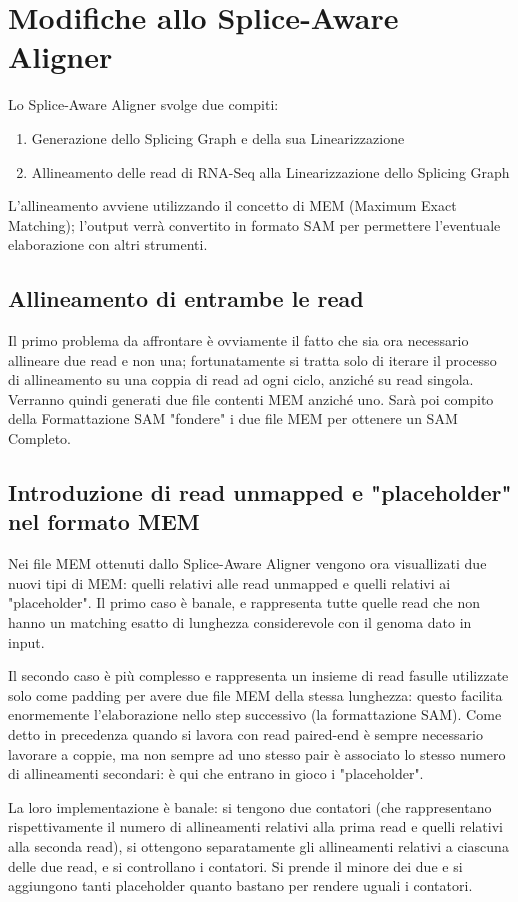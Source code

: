 \section{Modifiche allo Splice-Aware Aligner}
Lo Splice-Aware Aligner svolge due compiti:
\begin{enumerate}
	\item Generazione dello Splicing Graph e della sua Linearizzazione
	\item Allineamento delle read di RNA-Seq alla Linearizzazione dello Splicing Graph
\end{enumerate}
L'allineamento avviene utilizzando il concetto di MEM (Maximum Exact Matching); l'output verrà convertito in formato SAM per permettere l'eventuale elaborazione con altri strumenti.

\subsection{Allineamento di entrambe le read}
Il primo problema da affrontare è ovviamente il fatto che sia ora necessario allineare due read e non una; fortunatamente si tratta solo di iterare il processo di allineamento su una coppia di read ad ogni ciclo, anziché su read singola. Verranno quindi generati due file contenti MEM anziché uno. Sarà poi compito della Formattazione SAM "fondere" i due file MEM per ottenere un SAM Completo.

\subsection{Introduzione di read unmapped e "placeholder" nel formato MEM}
Nei file MEM ottenuti dallo Splice-Aware Aligner vengono ora visuallizati due nuovi tipi di MEM: quelli relativi alle read unmapped e quelli relativi ai "placeholder". Il primo caso è banale, e rappresenta tutte quelle read che non hanno un matching esatto di lunghezza considerevole con il genoma dato in input.

Il secondo caso è più complesso e rappresenta un insieme di read fasulle utilizzate solo come padding per avere due file MEM della stessa lunghezza: questo facilita enormemente l'elaborazione nello step successivo (la formattazione SAM). Come detto in precedenza quando si lavora con read paired-end è sempre necessario lavorare a coppie, ma non sempre ad uno stesso pair è associato lo stesso numero di allineamenti secondari: è qui che entrano in gioco i "placeholder". 

La loro implementazione è banale: si tengono due contatori (che rappresentano rispettivamente il numero di allineamenti relativi alla prima read e quelli relativi alla seconda read), si ottengono separatamente gli allineamenti relativi a ciascuna delle due read, e si controllano i contatori. Si prende il minore dei due e si aggiungono tanti placeholder quanto bastano per rendere uguali i contatori.


